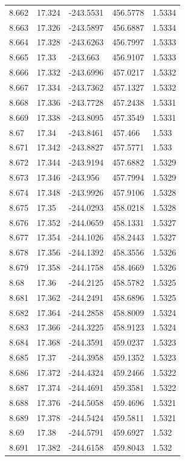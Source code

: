 \begin{tabular}{lllll}
8.662 & 17.324 & -243.5531 & 456.5778 & 1.5334 \\
8.663 & 17.326 & -243.5897 & 456.6887 & 1.5334 \\
8.664 & 17.328 & -243.6263 & 456.7997 & 1.5333 \\
8.665 & 17.33 & -243.663 & 456.9107 & 1.5333 \\
8.666 & 17.332 & -243.6996 & 457.0217 & 1.5332 \\
8.667 & 17.334 & -243.7362 & 457.1327 & 1.5332 \\
8.668 & 17.336 & -243.7728 & 457.2438 & 1.5331 \\
8.669 & 17.338 & -243.8095 & 457.3549 & 1.5331 \\
8.67 & 17.34 & -243.8461 & 457.466 & 1.533 \\
8.671 & 17.342 & -243.8827 & 457.5771 & 1.533 \\
8.672 & 17.344 & -243.9194 & 457.6882 & 1.5329 \\
8.673 & 17.346 & -243.956 & 457.7994 & 1.5329 \\
8.674 & 17.348 & -243.9926 & 457.9106 & 1.5328 \\
8.675 & 17.35 & -244.0293 & 458.0218 & 1.5328 \\
8.676 & 17.352 & -244.0659 & 458.1331 & 1.5327 \\
8.677 & 17.354 & -244.1026 & 458.2443 & 1.5327 \\
8.678 & 17.356 & -244.1392 & 458.3556 & 1.5326 \\
8.679 & 17.358 & -244.1758 & 458.4669 & 1.5326 \\
8.68 & 17.36 & -244.2125 & 458.5782 & 1.5325 \\
8.681 & 17.362 & -244.2491 & 458.6896 & 1.5325 \\
8.682 & 17.364 & -244.2858 & 458.8009 & 1.5324 \\
8.683 & 17.366 & -244.3225 & 458.9123 & 1.5324 \\
8.684 & 17.368 & -244.3591 & 459.0237 & 1.5323 \\
8.685 & 17.37 & -244.3958 & 459.1352 & 1.5323 \\
8.686 & 17.372 & -244.4324 & 459.2466 & 1.5322 \\
8.687 & 17.374 & -244.4691 & 459.3581 & 1.5322 \\
8.688 & 17.376 & -244.5058 & 459.4696 & 1.5321 \\
8.689 & 17.378 & -244.5424 & 459.5811 & 1.5321 \\
8.69 & 17.38 & -244.5791 & 459.6927 & 1.532 \\
8.691 & 17.382 & -244.6158 & 459.8043 & 1.532 \\

\end{tabular}
